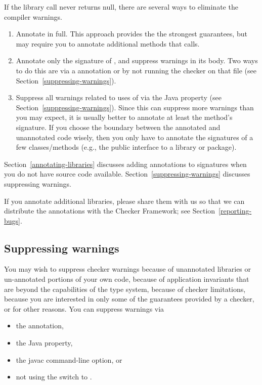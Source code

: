 If the library call never returns null,
there are several ways to eliminate the compiler warnings.
\begin{enumerate}
\item Annotate  in full.  This approach provides the
  the strongest guarantees, but may require you to annotate additional
  methods that  calls.
\item Annotate only the signature of , and
  suppress warnings in its body.  Two ways to do this are via a
   annotation or by not running the checker on that
  file (see Section~\ref{suppressing-warnings}).
\item Suppress all warnings related to uses of 
  via the  Java property
  (see Section~\ref{suppressing-warnings}).
  Since this can suppress more warnings than you may expect,
  it is usually better to annotate at least the method's signature.  If you
  choose the boundary between the annotated and unannotated code wisely,
  then you only have to annotate the signatures of a few classes/methods
  (e.g., the public interface to a library or package).
  
\end{enumerate}

Section~\ref{annotating-libraries} discusses adding annotations to
signatures when you do not have source code available.
Section~\ref{suppressing-warnings} discusses suppressing warnings.


If you annotate additional libraries, please share them with us so that we
can distribute the annotations with the Checker Framework; see
Section~\ref{reporting-bugs}.


\subsection{Suppressing warnings\label{suppressing-warnings}}

You may wish to suppress checker warnings because of unannotated libraries
or un-annotated portions of your own code, because of application
invariants that are beyond the capabilities of the type system, because of
checker limitations, because you are interested in only some of the
guarantees provided by a checker, or for other reasons.  You can suppress
warnings via
\begin{itemize}
\item
  the  annotation,
\item
  the  Java property,
\item
  the javac  command-line option, or
\item
  not using the  switch to .
\end{itemize}

